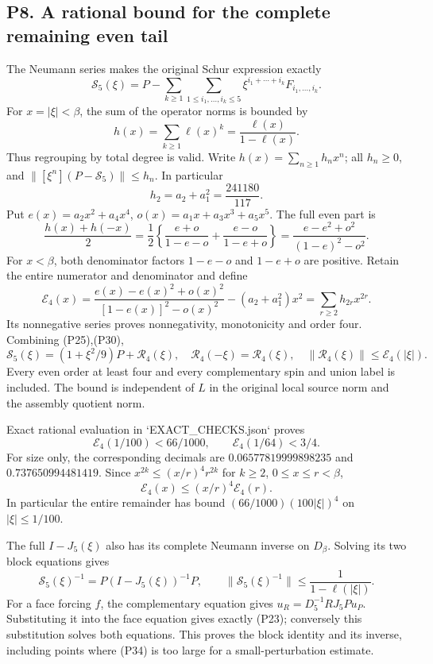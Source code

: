 \documentclass[11pt]{article}
\begin{document}
\subsection*{P8. A rational bound for the complete remaining even tail}

The Neumann series makes the original Schur expression exactly
\[
 \mathscr S_5(\xi)=P-
 \sum_{k\ge1}\sum_{1\le i_1,\ldots,i_k\le5}
 \xi^{i_1+\cdots+i_k}F_{i_1,\ldots,i_k}. \tag{P31}
\]
For \(x=|\xi|<\beta\), the sum of the operator norms is bounded by
\[
 h(x)=\sum_{k\ge1}\ell(x)^k=\frac{\ell(x)}{1-\ell(x)}.
\]
Thus regrouping by total degree is valid. Write \(h(x)=\sum_{n\ge1}h_nx^n\); all \(h_n\ge0\), and
\(\|[\xi^n](P-\mathscr S_5)\|\le h_n\). In particular
\[
 h_2=a_2+a_1^2=\frac{241180}{117}. \tag{P32}
\]
Put \(e(x)=a_2x^2+a_4x^4\), \(o(x)=a_1x+a_3x^3+a_5x^5\). The full even part is
\[
 \frac{h(x)+h(-x)}2
 =\frac12\left\{\frac{e+o}{1-e-o}+\frac{e-o}{1-e+o}\right\}
 =\frac{e-e^2+o^2}{(1-e)^2-o^2}. \tag{P33}
\]
For \(x<\beta\), both denominator factors \(1-e-o\) and \(1-e+o\) are positive. Retain the entire numerator and denominator and define
\[
 \mathcal E_4(x)=
 \frac{e(x)-e(x)^2+o(x)^2}{[1-e(x)]^2-o(x)^2}
 -(a_2+a_1^2)x^2
 =\sum_{r\ge2}h_{2r}x^{2r}. \tag{P34}
\]
Its nonnegative series proves nonnegativity, monotonicity and order four. Combining (P25),(P30),
\[
 \boxed{\mathscr S_5(\xi)=
 (1+\xi^2/9)P+\mathcal R_4(\xi),\quad
 \mathcal R_4(-\xi)=\mathcal R_4(\xi),\quad
 \|\mathcal R_4(\xi)\|\le\mathcal E_4(|\xi|).} \tag{P35}
\]
Every even order at least four and every complementary spin and union label is included. The bound is independent of \(L\) in the original local source norm and the assembly quotient norm.

Exact rational evaluation in `EXACT\_CHECKS.json` proves
\[
 \mathcal E_4(1/100)<66/1000,\qquad
 \mathcal E_4(1/64)<3/4. \tag{P36}
\]
For size only, the corresponding decimals are \(0.06577819999898235\) and \(0.737650994481419\). Since \(x^{2k}\le(x/r)^4r^{2k}\) for \(k\ge2\), \(0\le x\le r<\beta\),
\[
 \mathcal E_4(x)\le(x/r)^4\mathcal E_4(r). \tag{P37}
\]
In particular the entire remainder has bound \((66/1000)(100|\xi|)^4\) on \(|\xi|\le1/100\).

The full \(I-J_5(\xi)\) also has its complete Neumann inverse on \(D_\beta\). Solving its two block equations gives
\[
 \mathscr S_5(\xi)^{-1}=P(I-J_5(\xi))^{-1}P,\qquad
 \|\mathscr S_5(\xi)^{-1}\|\le\frac1{1-\ell(|\xi|)}. \tag{P38}
\]
For a face forcing \(f\), the complementary equation gives \(u_R=D_5^{-1}RJ_5Pu_P\). Substituting it into the face equation gives exactly (P23); conversely this substitution solves both equations. This proves the block identity and its inverse, including points where (P34) is too large for a small-perturbation estimate.
\end{document}
